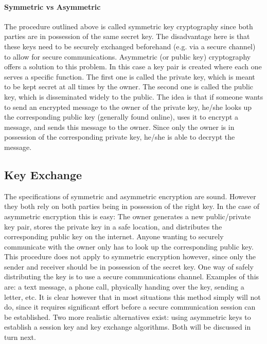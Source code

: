 \documentclass[11pt]{article}
\begin{document}
\paragraph{Symmetric vs Asymmetric}The procedure outlined above is called symmetric key cryptography since both parties are in possession of the same secret key. The disadvantage here is that these keys need to be securely exchanged beforehand (e.g. via a secure channel) to allow for secure communications. Asymmetric (or public key) cryptography offers a solution to this problem. In this case a key pair is created where each one serves a specific function. The first one is called the private key, which is meant to be kept secret at all times by the owner. The second one is called the public key, which is disseminated widely to the public. The idea is that if someone wants to send an encrypted message to the owner of the private key, he/she looks up the corresponding public key (generally found online), uses it to encrypt a message, and sends this message to the owner. Since only the owner is in possession of the corresponding private key, he/she is able to decrypt the message.

\subsection{Key Exchange} The specifications of symmetric and asymmetric encryption are sound. However they both rely on both parties being in possession of the right key. In the case of asymmetric encryption this is easy: The owner generates a new public/private key pair, stores the private key in a safe location, and distributes the corresponding public key on the internet. Anyone wanting to securely communicate with the owner only has to look up the corresponding public key. This procedure does not apply to symmetric encryption however, since only the sender and receiver should be in possession of the secret key. One way of safely distributing the key is to use a secure communications channel. Examples of this are: a text message, a phone call, physically handing over the key, sending a letter, etc. It is clear however that in most situations this method simply will not do, since it requires significant effort before a secure communication session can be established. Two more realistic alternatives exist: using asymmetric keys to establish a session key and key exchange algorithms. Both will be discussed in turn next.
\end{document}
